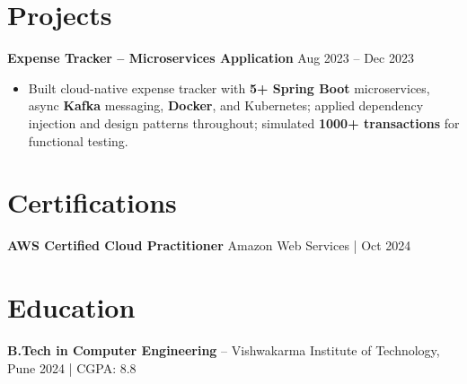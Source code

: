 \documentclass[letterpaper,10pt]{article}
\begin{document}
\section*{Projects}

\textbf{Expense Tracker -- Microservices Application} \hfill Aug 2023 -- Dec 2023
\begin{itemize}[leftmargin=*]
    \item Built cloud-native expense tracker with \textbf{5+ Spring Boot} microservices, async \textbf{Kafka} messaging, \textbf{Docker}, and Kubernetes; applied dependency injection and design patterns throughout; simulated \textbf{1000+ transactions} for functional testing.
\end{itemize}

\section*{Certifications}
\textbf{AWS Certified Cloud Practitioner} \hfill Amazon Web Services \;|\; Oct 2024

\section*{Education}
\textbf{B.Tech in Computer Engineering} -- Vishwakarma Institute of Technology, Pune \hfill 2024 \;|\; CGPA: 8.8
\end{document}
